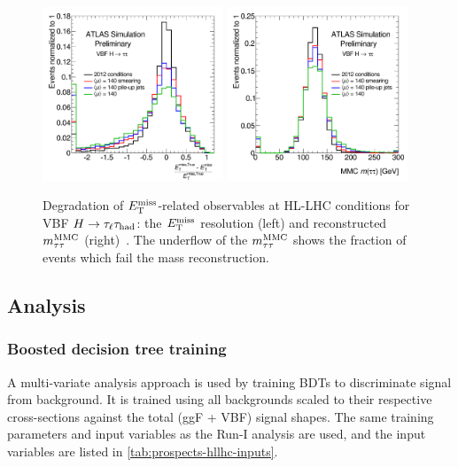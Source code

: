 \begin{figure}[!htpb]
  \centering
  \includegraphics[width=0.48\textwidth]{figures/ATL-PHYS-PUB-2014-018/fig_01a}
  \includegraphics[width=0.48\textwidth]{figures/ATL-PHYS-PUB-2014-018/fig_01b}
  \caption{Degradation of $E_{\mathrm{T}}^{\mathrm{miss}}$-related observables at HL-LHC conditions for VBF $H\rightarrow\tau_\ell\tau_\text{had}$: the $E_{\mathrm{T}}^{\mathrm{miss}}$ resolution (left) and reconstructed $m_{\tau\tau}^\text{MMC}$ (right)~\cite{ATL-PHYS-PUB-2014-018}. The underflow of the $m_{\tau\tau}^\text{MMC}$ shows the fraction of events which fail the mass reconstruction.}
  \label{fig:prospects-hllhc-degradation}
\end{figure}

\subsection{Analysis}

\subsubsection{Boosted decision tree training}

A multi-variate analysis approach is used by training BDTs to discriminate signal from background. It is trained using all backgrounds scaled to their respective cross-sections against the total (ggF + VBF) signal shapes. The same training parameters and input variables as the Run-I analysis are used, and the input variables are listed in \cref{tab:prospects-hllhc-inputs}.

